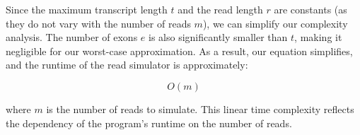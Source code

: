 \documentclass{article}
\begin{document}
    Since the maximum transcript length \( t \) and the read length \( r \) are constants (as they do not vary with the number of reads \( m \)), we can simplify our complexity analysis. The number of exons \( e \) is also significantly smaller than \( t \), making it negligible for our worst-case approximation. As a result, our equation simplifies, and the runtime of the read simulator is approximately:

    \[
        O(m)
    \]

    where \( m \) is the number of reads to simulate. This linear time complexity reflects the dependency of the program's runtime on the number of reads.
\end{document}
